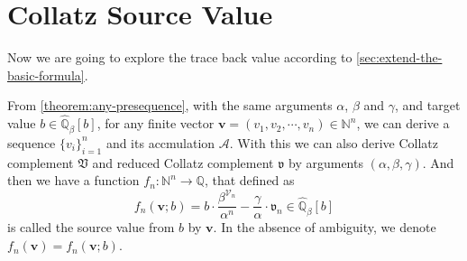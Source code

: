 \section{Collatz Source Value}\label{sec:collatz-source-value}
Now we are going to explore the trace back value according to \cref{sec:extend-the-basic-formula}.
\begin{definition}\label{def:source-value-function}
From \cref{theorem:any-presequence}, with the same arguments $\alpha$, $\beta$ and $\gamma$, and target value $b\in \widehat{\mathbb{Q}}_{{\beta}}[b]$, for any finite vector $\bm{v} = (v_{1}, v_{2}, \cdots, v_{n}) \in \mathbb{N}^{n}$, we can derive a sequence $\{v_i\}_{i=1}^{n}$ and its accmulation $\mathcal{A}$. With this we can also derive Collatz complement $\mathfrak{V}$ and reduced Collatz complement $\mathfrak{v}$ by arguments $(\alpha, \beta, \gamma)$. And then we have a function $f_n : \mathbb{N}^{n} \to \mathbb{Q}$, that defined as
\[ f_{n}(\bm{v};b) = b \cdot \frac{\beta^{\mathcal{V}_{n}}}{\alpha^{n}} - \frac{\gamma}{\alpha}\cdot \mathfrak{v}_{n} \in \widehat{\mathbb{Q}}_{{\beta}}[b] \]
is called the source value from $b$ by $\bm{v}$. In the absence of ambiguity, we denote $f_{n}(\bm{v}) = f_{n}(\bm{v};b)$.
\end{definition}

